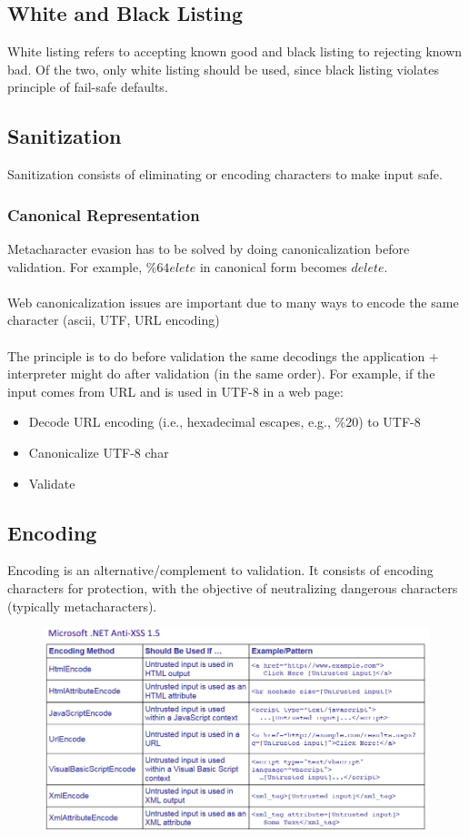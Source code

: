 \documentclass[10pt,a4paper]{report}
\begin{document}
\subsection{White and Black Listing}
White listing refers to accepting known good and black listing to rejecting known bad. Of the two, only white listing should be used, since black listing  violates principle of fail-safe defaults.
\subsection{Sanitization}
Sanitization consists of eliminating or encoding characters to make input safe.
\subsubsection{Canonical Representation}
Metacharacter evasion has to be solved by doing canonicalization before validation. For example, $\%64elete$ in canonical form becomes $delete$.\\
\\
Web canonicalization issues are important due to many ways to encode the same character (ascii, UTF, URL encoding)\\
\\
The principle is to do before validation the same decodings the application + interpreter might do after validation (in the same order). For example, if the input comes from URL and is used in UTF-8 in a web page:
\begin{itemize}
\item Decode URL encoding (i.e., hexadecimal escapes, e.g., \%20) to UTF-8
\item Canonicalize UTF-8 char
\item Validate
\end{itemize}
\subsection{Encoding}
Encoding is an alternative/complement to validation. It consists of encoding characters for protection, with the objective of neutralizing dangerous characters (typically metacharacters).
\begin{figure}[H]
\centering
\includegraphics[scale=0.4]{12.png}
\end{figure}
\end{document}
